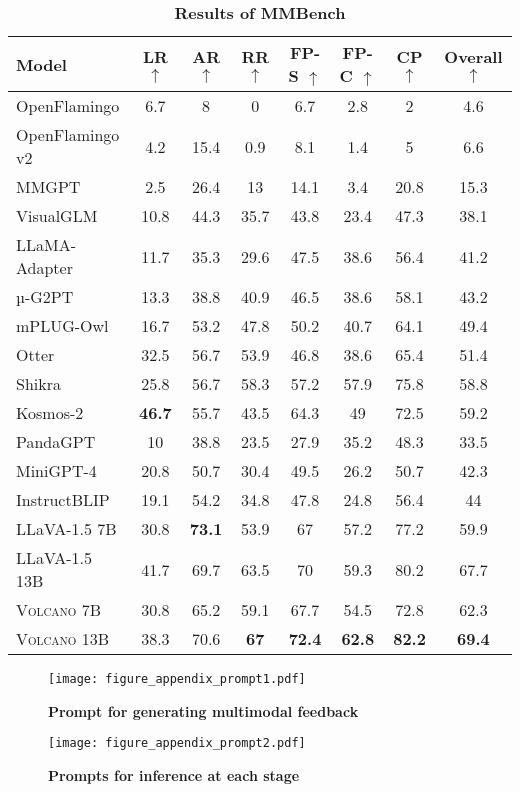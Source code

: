 \documentclass[11pt]{article}
\newcommand{\Ours}{\textsc{Volcano}}
\begin{document}
\begin{table*}[t]
\centering
\begin{tabular}{lcccccc|c}
\toprule
Model & LR $\uparrow$ &	AR $\uparrow$	& RR $\uparrow$	& FP-S $\uparrow$& 	FP-C $\uparrow$&	CP $\uparrow$& 	Overall $\uparrow$\\
\midrule
OpenFlamingo & 6.7 & 8 & 0 & 6.7 & 2.8	& 2	& 4.6 \\
OpenFlamingo v2	& 4.2	& 15.4	& 0.9	& 8.1	& 1.4	& 5	& 6.6 \\
MMGPT	& 2.5	& 26.4	& 13	& 14.1	& 3.4	& 20.8	& 15.3 \\
VisualGLM	& 10.8	& 44.3	& 35.7	& 43.8	& 23.4	& 47.3	& 38.1 \\
LLaMA-Adapter	& 11.7	& 35.3	& 29.6	& 47.5	& 38.6	& 56.4	& 41.2 \\
µ-G2PT	& 13.3	& 38.8	& 40.9	& 46.5	& 38.6	& 58.1	& 43.2 \\
mPLUG-Owl	& 16.7	& 53.2	& 47.8	& 50.2	& 40.7	& 64.1	& 49.4 \\
Otter	& 32.5	& 56.7	& 53.9	& 46.8	& 38.6	& 65.4	& 51.4 \\
Shikra	& 25.8	& 56.7	& 58.3	& 57.2	& 57.9	& 75.8	& 58.8 \\
Kosmos-2	& \textbf{46.7}	& 55.7	& 43.5	& 64.3	& 49	& 72.5	& 59.2 \\
PandaGPT	& 10	& 38.8	& 23.5	& 27.9	& 35.2	& 48.3	& 33.5 \\
MiniGPT-4	& 20.8	& 50.7	& 30.4	& 49.5	& 26.2	& 50.7	& 42.3 \\
InstructBLIP	& 19.1	& 54.2	& 34.8	& 47.8	& 24.8	& 56.4	& 44 \\
\midrule
LLaVA-1.5 7B	& 30.8	& \textbf{73.1}	& 53.9	& 67	& 57.2	& 77.2	& 59.9 \\
LLaVA-1.5 13B	& 41.7	& 69.7	& 63.5	& 70	& 59.3	& 80.2	& 67.7 \\
{\Ours} 7B	& 30.8	& 65.2	& 59.1	& 67.7	& 54.5	& 72.8	& 62.3 \\
{\Ours} 13B	& 38.3	& 70.6	&\textbf{67}	& \textbf{72.4}	& \textbf{62.8}	& \textbf{82.2}	& \textbf{69.4} \\
\bottomrule
\end{tabular}
\caption{\textbf{Results of MMBench}}
\label{tab:Table9}
\end{table*}
\begin{figure*}[h]
\texttt{[image: figure\_appendix\_prompt1.pdf]}
\caption{\textbf{Prompt for generating multimodal feedback}}
\end{figure*}
\begin{figure*}[h]
\texttt{[image: figure\_appendix\_prompt2.pdf]}
\caption{\textbf{Prompts for inference at each stage}}
\end{figure*}
\end{document}
